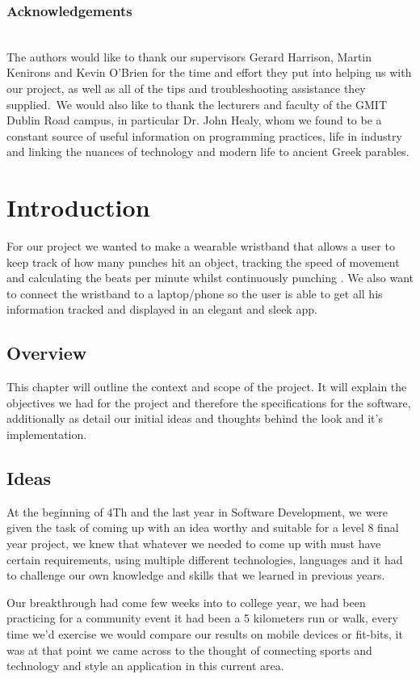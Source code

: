 \documentclass[a4paper,12pt,twoside]{report}
\begin{document}
\subsection*{Acknowledgements}
\\
The authors would like to thank our supervisors Gerard Harrison, Martin Kenirons and Kevin O’Brien for the time and effort they put into helping us with our project, as well as all of the tips and troubleshooting assistance they supplied.\ 
We would also like to thank the lecturers and faculty of the GMIT Dublin Road campus, in particular Dr. John Healy, whom we found to be a constant source of useful information on programming practices, life in industry and linking the nuances of technology and modern life to ancient Greek parables.

\body

\chapter{Introduction}
For our project we wanted to make a wearable wristband that allows a user to keep track of how many punches hit an object, tracking the speed of movement and calculating the beats per minute whilst continuously punching . We also want to connect the wristband to a laptop/phone so the user is able to get all his information tracked and displayed in an elegant and sleek app.

\section{Overview}
This chapter will outline the context and scope of the project. It
will explain the objectives we had for the project and therefore the specifications for the software, additionally as detail our initial ideas and thoughts
behind the look and it’s implementation.

\section{Ideas}
At the beginning of 4Th and the last year in Software Development, we were given the task of coming up with an idea worthy and suitable for a level 8 final year project, we knew that whatever we needed to come up with must have certain requirements, using multiple different technologies, languages and it had to challenge our own knowledge and skills that we learned in previous years.

Our breakthrough had come few weeks into to college year, we had been practicing for a community event it had been a 5 kilometers run or walk, every time we'd exercise we would compare our results on mobile devices or fit-bits, it was at that point we came across to the thought of connecting sports and technology and style an application in this current area. 
\end{document}
